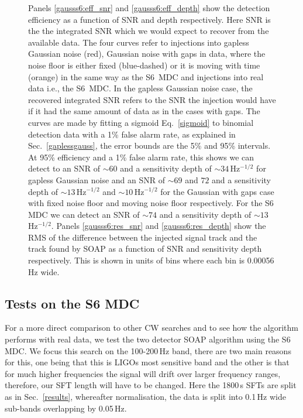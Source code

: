 \begin{figure}[p]
\caption{Panels \ref{gausss6:eff_snr} and \ref{gausss6:eff_depth} show the detection efficiency as a function of \ac{SNR} and depth respectively. Here \ac{SNR} is the the integrated \ac{SNR} which we would expect to recover from the available data. The four curves refer to injections into gapless Gaussian noise (red), Gaussian noise with gaps in data, where the noise floor is either fixed (blue-dashed) or it is moving with time (orange) in the same way as the S6~\ac{MDC} and injections into real data i.e., the S6~\ac{MDC}. In the gapless Gaussian noise case, the recovered integrated \ac{SNR} refers to the \ac{SNR} the injection would have if it had the same amount of data as in the cases with gaps.
The curves are made by fitting a sigmoid Eq.~\ref{sigmoid} to binomial detection data with a 1\% false alarm rate, as explained in Sec.~\ref{gaplessgauss}, the error bounds are the 5\% and 95\% intervals.
At 95\% efficiency and a 1\% false alarm rate, this shows we can detect to an \ac{SNR}  of $\sim 60$ and a sensitivity depth of $\sim 34$\,Hz$^{-1/2}$ for gapless Gaussian noise and an \ac{SNR}  of $\sim 69$ and $72$ and a sensitivity depth of $\sim 13$\,Hz$^{-1/2}$ and $\sim 10$\,Hz$^{-1/2}$ for the Gaussian with gaps case with fixed noise floor and moving noise floor respectively. For the S6 \ac{MDC} we can detect an \ac{SNR} of $\sim 74$ and a sensitivity depth of $\sim 13$\,Hz$^{-1/2}$. 
 Panels \ref{gausss6:res_snr} and \ref{gausss6:res_depth} show the \ac{RMS} of the difference between the injected signal track and the track found by SOAP as a function of \ac{SNR} and sensitivity depth respectively. This is shown in units of bins where each bin is 0.00056 Hz wide.\label{gausss6:plots} }
\end{figure}


\subsection{\label{results:s6}Tests on the S6 MDC}
%
%
For a more direct comparison to other \ac{CW} searches and to see how the
algorithm performs with real data, we test the two detector SOAP algorithm using the S6 \ac{MDC}. We focus this search on the 100-200\,Hz band, there are two main reasons for this, one being that this is \acp{LIGO} most sensitive band and the other is that for much higher frequencies the signal will drift over larger frequency ranges, therefore, our \ac{SFT} length will have to be changed.
Here the 1800\,s \acp{SFT} are split as in Sec.~\ref{results}, whereafter normalisation, the data is split into 0.1\,Hz wide sub-bands overlapping by 0.05\,Hz.

